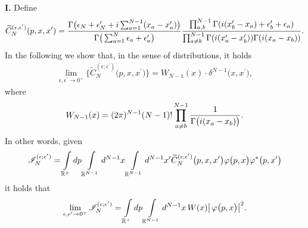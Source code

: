 \documentclass[11pt]{article}
\numberwithin{equation}{section}
\numberwithin{equation}{section}
\begin{document}
{\bf I.} Define
\begin{gather*}
\widetilde C_N^{( \epsilon, \epsilon')}(p, x, x')=
\frac{\Gamma\big(
\epsilon_N+\epsilon'_N+{\rm i}\sum_{a=1}^{N-1}(x_a-x'_a)\big)}{\Gamma\big(\sum_{a=1}^N\epsilon_a+\epsilon'_a\big) }
 \frac{ \prod_{ a, b }^{ N-1 }\Gamma({\rm i}(x'_b-x_a)+\epsilon'_b+\epsilon_a)}{ \prod_{ a \not= b }^{ N-1 }
\Gamma( {\rm i} (x_{a}^{\prime}-x_{b}^{\prime})) \Gamma( {\rm i} (x_{a}-x_{b})) }.
\end{gather*}
In the following we show that, in the sense of distributions, it holds
\begin{gather*}
\lim_{\epsilon, \epsilon^{\prime} \rightarrow 0^+ } \big\{ \widetilde{C}_N^{(\epsilon;\epsilon^{\prime})}\big(p,x,x^{\prime} \big) \big\}
= W_{N-1}(x) \cdot \delta^{N-1}\big(x,x^{\prime} \big),
\end{gather*}
where
\begin{gather}\label{W-N-def}
W_{N-1}(x) = (2\pi)^{N-1} (N-1)! \prod\limits_{a\not=b}^{N-1} \frac{1}{ \Gamma\big({\rm i} (x_{a}-x_{b}) \big) }.
\end{gather}
In other words, given
\begin{gather}
\mathscr{I}_N^{(\epsilon;\epsilon^{\prime})} = \int\limits_{\mathbb{R}^+}{} {\rm d}p \int\limits_{\mathbb{R}^{N-1}}{}
{\rm d}^{N-1}x \int\limits_{\mathbb{R}^{N-1}}{} {\rm d}^{N-1}x^{\prime}
\widetilde{C}_N^{(\epsilon;\epsilon^{\prime})}\big(p,x,x^{\prime} \big)
\varphi\big(p,x\big)\varphi^{*}\big(p,x^{\prime}\big)
\label{equation definition msc IN}
\end{gather}
it holds that
\begin{gather*}
\lim_{\epsilon, \epsilon^{\prime} \rightarrow 0^+ } \mathscr{I}_N^{(\epsilon;\epsilon^{\prime})}
=
 \int\limits_{\mathbb{R}^+}{} {\rm d}p \int\limits_{\mathbb{R}^{N-1}}{} {\rm d}^{N-1}x\, W(x) \big| \,\varphi\big(p,x\big) \big|^2 .
\end{gather*}
\end{document}
